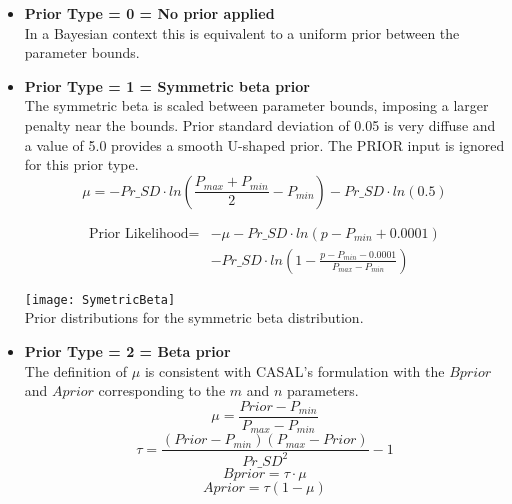 \begin{itemize}
\item  \textbf{Prior Type = 0 = No prior applied} \\ 
In a Bayesian context this is equivalent to a uniform prior between the parameter bounds.

\item  \textbf{Prior Type = 1 = Symmetric beta prior} \\ 
The symmetric beta is scaled between parameter bounds, imposing a larger penalty near the bounds.  Prior standard deviation of 0.05 is very diffuse and a value of 5.0 provides a smooth U-shaped prior. The PRIOR input is ignored for this prior type.
	\begin{equation}  
                \mu = -Pr\_SD \cdot ln\left(\frac{P_{max}+P_{min}}{2} - P_{min} \right) - Pr\_SD \cdot ln(0.5)
        \end{equation}

	\begin{equation}
		\begin{split}
			\text{Prior Likelihood} = & -\mu - Pr\_SD \cdot ln\left(p-P_{min}+0.0001\right) \\
			& - Pr\_SD \cdot ln\left(1-\frac{p-P_{min}-0.0001}{P_{max}-P_{min}}\right)
		\end{split}
	\end{equation}

	\begin{center}
			\texttt{[image: SymetricBeta]}\\
			Prior distributions for the symmetric beta distribution.
	\end{center}

\item \textbf{Prior Type = 2 = Beta prior}  \\ 
The definition of $\mu$ is consistent with CASAL's formulation with the $Bprior$ and $Aprior$ corresponding to the $m$ and $n$ parameters.
	\begin{equation}
		\mu = \frac{Prior-P_{min}}{P_{max}-P_{min}} 
        \end{equation}
	\begin{equation}
		\tau  = \frac{(Prior-P_{min})(P_{max}-Prior)}{Pr\_SD^2}-1
        \end{equation}
	\begin{equation}
		Bprior  = \tau \cdot \mu
        \end{equation}
	\begin{equation}
                Aprior = \tau (1-\mu)
        \end{equation}


\end{itemize}
